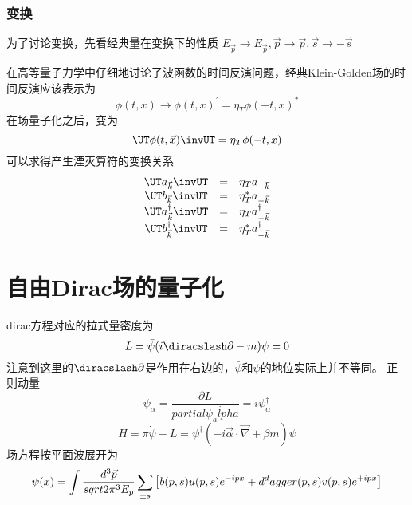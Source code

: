 \subsubsection{\T 变换}
为了讨论\T 变换，先看经典量在\T 变换下的性质
$E_{\vec p}\rightarrow E_{\vec p}, \vec p\rightarrow \vec p, \vec s\rightarrow-\vec s $

在高等量子力学中仔细地讨论了波函数的时间反演问题，经典Klein-Golden场的时间反演应该表示为
\begin{equation}
    \phi(t, x) \rightarrow \phi(t, x)^{\prime} = \eta_T\phi(-t, x)^*
\end{equation}
在场量子化之后，变为
\begin{equation}
    \UT\phi(t,\vec x)\invUT = \eta_T\phi(-t, x)
\end{equation}
可以求得产生湮灭算符的变换关系
\begin{equation}
    \begin{array}{ccc}
        \UT a_{\vec k}\invUT &=& \eta_T a_{-\vec k} \\
        \UT b_{\vec k}\invUT &=& \eta_T^* a_{-\vec k} \\
        \UT a_{\vec k}^\dagger\invUT &=& \eta_T a_{-\vec k}^\dagger \\
        \UT b_{\vec k}^\dagger\invUT &=& \eta_T^* a_{-\vec k}^\dagger \\
    \end{array}
\end{equation}


\section{自由Dirac场的量子化}
dirac方程对应的拉式量密度为
\begin{equation}
    L = \bar \psi(i\diracslash \partial - m)\psi = 0
\end{equation}
注意到这里的$\diracslash \partial$是作用在右边的，$\bar \psi$和$\psi$的地位实际上并不等同。
正则动量
\begin{equation}
    \psi_\alpha = \frac {\partial L} {partial \dot{\psi_alpha}} = i\psi_\alpha^\dagger
\end{equation}
\begin{equation}
    H = \pi \dot{\psi} - L = \psi^\dagger(-i\vec \alpha \cdot \vec \nabla + \beta m)\psi
\end{equation}
场方程按平面波展开为
\begin{equation}
    \psi(x) = \int \frac{d^3\vec{p}}{sqrt{2\pi^3}E_{p}} \sum_{\pm s} \left[b(p, s)u(p, s)e^{-ipx} + d^dagger(p,s)v(p,s)e^{+ipx}\right]
\end{equation}

